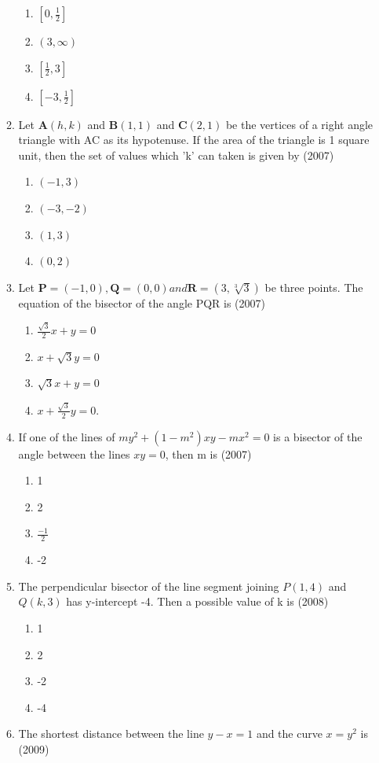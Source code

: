 \documentclass[12pt]{article}
\providecommand{\sbrak}[1]{\ensuremath{{}\left[#1\right]}}
\let\vec\mathbf
\begin{document}
\begin{enumerate}
\begin{enumerate}
\begin{enumerate}
\item $\sbrak{0,\frac{1}{2}}$ 
\item $(3,\infty)$ 
\item $\sbrak{\frac{1}{2},3}$ 
\item $\sbrak{-3,\frac{1}{2}}$
\end{enumerate}
\item Let $\vec{A}(h,k)$ and $\vec{B}(1,1)$ and $\vec{C}(2,1)$ be the vertices of a right angle triangle with AC as its hypotenuse. If the area of the triangle is 1 square unit, then the set of values which 'k' can taken is given by (2007)
\begin{enumerate}
\item $(-1,3)$ 
\item $(-3,-2)$
\item $(1,3)$ 
\item $(0,2)$
\end{enumerate}
\item Let $\vec{P}=(-1,0),\vec{Q}=(0,0) and \vec{R}=(3,\sqrt[3]{3})$ be three points. The equation of the bisector of the angle PQR is (2007)
\begin{enumerate}
\item $\frac{\sqrt{3}}{2}x+y=0$ 
\item $x+\sqrt{3}y=0$ 
\item $\sqrt{3}x+y=0$ 
\item $x+\frac{\sqrt{3}}{2}y=0$.
\end{enumerate}
\item If one of the lines of $my^2+(1-m^2)xy-mx^2=0$ is a bisector of the angle between the lines $xy=0$, then m is (2007)
\begin{enumerate}
\item 1  
\item 2 
\item $\frac{-1}{2}$ 
\item -2
\end{enumerate}
\item The perpendicular bisector of the line segment joining $P(1,4)$ and $Q(k,3)$ has y-intercept -4. Then a possible value of k is (2008)
\begin{enumerate}
\item  1 
\item  2 
\item -2 
\item -4
\end{enumerate}
\item The shortest distance between the line $y-x=1$ and the curve $x=y^2$ is (2009)

\end{enumerate}
\end{enumerate}
\end{document}

